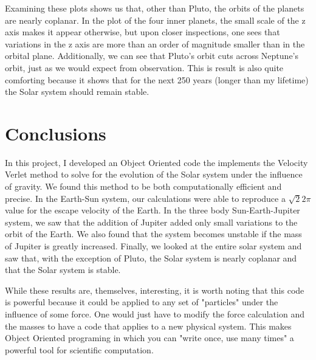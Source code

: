\documentclass[%
oneside,                 %
final,                   %
10pt]{article}
\begin{document}
Examining these plots shows us that, other than Pluto, the orbits of the planets are nearly coplanar.  In the plot of the four inner planets, the small scale of the z axis makes it appear otherwise, but upon closer inspections, one sees that variations in the z axis are more than an order of magnitude smaller than in the orbital plane.  Additionally, we can see that Pluto's orbit cuts across Neptune's orbit, just as we would expect from observation.  This is result is also quite comforting because it shows that for the next 250 years (longer than my lifetime) the Solar system should remain stable.  

\section{Conclusions}

In this project, I developed an Object Oriented code the implements the Velocity Verlet method to solve for the evolution of the Solar system under the influence of gravity.  We found this method to be both computationally efficient and precise.  In the Earth-Sun system, our calculations were able to reproduce a $\sqrt{2}2 \pi$ value for the escape velocity of the Earth.  In the three body Sun-Earth-Jupiter system, we saw that the addition of Jupiter added only small variations to the orbit of the Earth. We also found that the system becomes unstable if the mass of Jupiter is greatly increased.  Finally, we looked at the entire solar system and saw that, with the exception of Pluto, the Solar system is nearly coplanar and that the Solar system is stable.

While these results are, themselves, interesting, it is worth noting that this code is powerful because it could be applied to any set of "particles" under the influence of some force.  One would just have to modify the force calculation and the masses to have a code that applies to a new physical system.  This makes Object Oriented programing in which you can "write once, use many times" a powerful tool for scientific computation.
\end{document}
